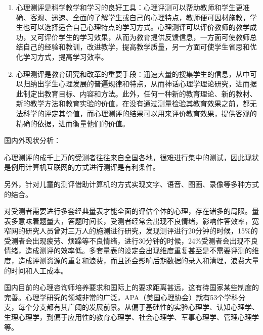 \documentclass[a4paper]{ctexart}
\begin{document}
{\begin{enumerate}
	\item 心理测评是科学教学和学习的良好工具：心理评测可以帮助教师和学生更准确、客观、迅速、全面的了解学生或自己的心理特点，教师便可因材施教，学生也可以选择适合自己心理特点的学习方式。心理测评可以评价教师的教学成功，又可评价学生的学习效果，从而为教育提供反馈信息，一方面可使教师总结自己的经验和教训，改进教学，提高教学质量，另一方面可使学生省思和优化学习方式，提高学习效率。
	\item 心理测评是教育研究和改革的重要手段：迅速大量的搜集学生的信息，从中可以归纳出学生心理发展的普遍规律和特点，从而神话心理学理论研究，进而据此制定出教育目标、内容和方法。此外，任何一种新的教育理论、新的教材、新的教学方法和教育实验的价值，在没有通过测量检验其教育效果之前，都无法科学的评定其价值，而心理测评的结果可以用来评价教育效果，提供客观的精确的依据，进而衡量他们的价值。
\end{enumerate}

国内外现状分析：

心理测评的成千上万的受测者往往来自全国各地，很难进行集中的测试，因此现状是例用计算机互联网的方式进行测评是有利条件。

另外，针对儿童的测评借助计算机的方式实现文字、语音、图画、录像等多种方式的结合。

对受测者需要进行多套经典量表才能全面的评估个体的心理，存在诸多的局限。量表多意味着题量大，答题时间长，受测者经常会出现不良情绪，影响作答效率，宽窄网的研究人员曾对三万人的施测进行研究，发现测评进行20分钟的时候，15\%的受测者会出现疲劳、烦躁等不良情绪，进行30分钟的时候，24\%受测者会出现不良情绪，造成测评的效率低。多套量表的设定会出现维度重复甚至是不需要评测的维度，造成评测资源的重复和浪费，而且还会影响后期数据的录入和清理，浪费大量的时间和人工成本。

国内目前的心理咨询师培养要求和国际上的要求距离甚远，这有待国家某些制度的完善。心理学研究的领域非常的广泛，APA（美国心理协会）就有53个学科分支，每个分支都有其广阔的发展前景。从偏于基础性的实验心理学、认知心理学、生理心理学，到偏于应用性的教育心理学、社会心理学、军事心理学、管理心理学等。

}
\end{document}
